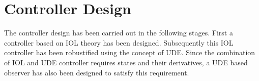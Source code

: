 \documentclass[conference]{IEEEtran}
\begin{document}

\section{Controller Design} \label{controller_design}

	The controller design has been carried out in the following stages. First a controller based on IOL theory has been designed. Subsequently this IOL controller has been robustified using the concept of UDE. Since the combination of IOL and UDE controller requires states and their derivatives, a UDE based observer has also been designed to satisfy this requirement.
	
\end{document}

